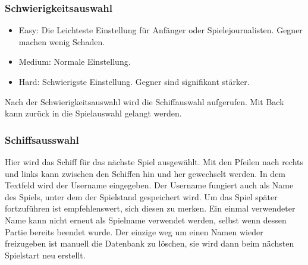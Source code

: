 \documentclass[fontsize=12pt,paper=a4,twoside]{scrartcl}
\begin{document}
\subsubsection{Schwierigkeitsauswahl}
\begin{itemize}
\item Easy: Die Leichteste Einstellung für Anfänger oder Spielejournalisten. Gegner machen wenig Schaden.
\item Medium: Normale Einstellung. 
\item Hard: Schwierigste Einstellung. Gegner sind signifikant stärker.
\end {itemize}
Nach der Schwierigkeitsauswahl wird die Schiffauswahl aufgerufen.
Mit Back kann zurück in die Spielauswahl gelangt werden. 

\subsubsection{Schiffsausswahl}
Hier wird das Schiff für das nächste Spiel ausgewählt.
Mit den Pfeilen nach rechts und links kann zwischen den Schiffen hin und her gewechselt werden.
In dem Textfeld wird der Username eingegeben. Der Username fungiert auch als Name des Spiels, unter dem der Spielstand gespeichert wird. Um das Spiel später fortzuführen ist empfehlenswert, sich diesen zu merken. Ein einmal verwendeter Name kann nicht erneut als Spielname verwendet werden, selbst wenn dessen Partie bereits beendet wurde. Der einzige weg um einen Namen wieder freizugeben ist manuell die Datenbank zu löschen, sie wird dann beim nächsten Spielstart neu erstellt.
\end{document}

